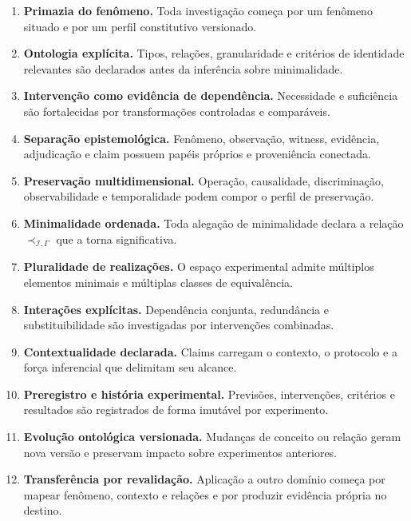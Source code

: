 \documentclass[11pt,a4paper]{article}
\begin{document}
\begin{enumerate}[label=\textbf{P\arabic*.}]
  \item \textbf{Primazia do fenômeno.}
  Toda investigação começa por um fenômeno situado e por um perfil constitutivo
  versionado.

  \item \textbf{Ontologia explícita.}
  Tipos, relações, granularidade e critérios de identidade relevantes são declarados
  antes da inferência sobre minimalidade.

  \item \textbf{Intervenção como evidência de dependência.}
  Necessidade e suficiência são fortalecidas por transformações controladas e
  comparáveis.

  \item \textbf{Separação epistemológica.}
  Fenômeno, observação, witness, evidência, adjudicação e claim possuem papéis próprios
  e proveniência conectada.

  \item \textbf{Preservação multidimensional.}
  Operação, causalidade, discriminação, observabilidade e temporalidade podem compor o
  perfil de preservação.

  \item \textbf{Minimalidade ordenada.}
  Toda alegação de minimalidade declara a relação $\prec_{\mathcal I,\Gamma}$ que a
  torna significativa.

  \item \textbf{Pluralidade de realizações.}
  O espaço experimental admite múltiplos elementos minimais e múltiplas classes de
  equivalência.

  \item \textbf{Interações explícitas.}
  Dependência conjunta, redundância e substituibilidade são investigadas por
  intervenções combinadas.

  \item \textbf{Contextualidade declarada.}
  Claims carregam o contexto, o protocolo e a força inferencial que delimitam seu
  alcance.

  \item \textbf{Preregistro e história experimental.}
  Previsões, intervenções, critérios e resultados são registrados de forma imutável
  por experimento.

  \item \textbf{Evolução ontológica versionada.}
  Mudanças de conceito ou relação geram nova versão e preservam impacto sobre
  experimentos anteriores.

  \item \textbf{Transferência por revalidação.}
  Aplicação a outro domínio começa por mapear fenômeno, contexto e relações e por
  produzir evidência própria no destino.
\end{enumerate}
\end{document}
